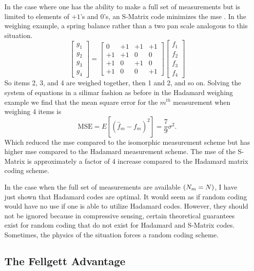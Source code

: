 In the case where one has the ability to make a full set of measurements but is limited to elements of $+1$'s and $0$'s, an S-Matrix code minimizes the \gls{mse} \cite{harwit2012hadamard}. In the weighing example, a spring balance rather than a two pan scale analogous to this situation. 
\begin{equation}
\left[ \begin{matrix} g_{1}\\ g_{2}\\ g_{3}\\ g_{4}\end{matrix} \right] = 
\left[ \begin{matrix} 0 & +1 & +1 & +1 \\ +1 & +1 & 0 & 0 \\ +1 & 0 & +1 & 0 \\ +1 & 0 & 0 & +1 \end{matrix} \right]
\left[ \begin{matrix} f_{1}\\ f_{2}\\ f_{3}\\ f_{4}\end{matrix} \right]
\end{equation}
So items 2, 3, and 4 are weighed together, then 1 and 2, and so on. Solving the system of equations in a silimar fashion as before in the Hadamard weighing example we find that the mean square error for the $m^{th}$ measurement when weighing 4 items is 
\begin{equation}
\text{MSE} = E [ ( \hat{f}_{m} - {f}_{m} )^2 ] = \frac{7}{9} \sigma^2.
\end{equation}
Which reduced the \gls{mse} compared to the \gls{isomorphic} measurement scheme but has higher \gls{mse} compared to the Hadamard measurement scheme. The \gls{mse} of the S-Matrix is approximately a factor of 4 increase compared to the Hadamard matrix coding scheme. 

In the case when the full set of measurements are available $\left( N_m = N \right)$, I have just shown that Hadamard codes are optimal. It would seem as if random coding would have no use if one is able to utilize Hadamard codes. However, they should not be ignored because in compressive sensing, certain theoretical guarantees exist for random coding that do not exist for Hadamard and S-Matrix codes. Sometimes, the physics of the situation forces a random coding scheme. 

\subsection{The Fellgett Advantage}

